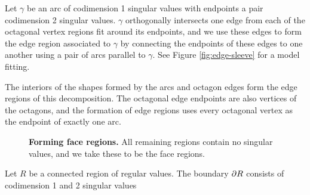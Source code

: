 Let $\gamma$ be an arc of codimension 1 singular values with endpoints a pair codimension 2 singular values.
$\gamma$ orthogonally intersects one edge from each of the octagonal vertex regions fit around its endpoints, and we use these edges to form the edge region associated to $\gamma$ by connecting the endpoints of these edges to one another using a pair of arcs parallel to $\gamma$.
See Figure \ref{fig:edge-sleeve} for a model fitting.

The interiors of the shapes formed by the arcs and octagon edges form the edge regions of this decomposition.
The octagonal edge endpoints are also vertices of the octagons, and the formation of edge regions uses every octagonal vertex as the endpoint of exactly one arc.

\begin{figure}[h!]
	\label{fig:face-sleeve}
	\caption{
		\textbf{Forming face regions.}
		All remaining regions contain no singular values, and we take these to be the face regions.
	}
\end{figure}

Let $R$ be a connected region of regular values.
The boundary $\partial R$ consists of codimension 1 and 2 singular values
